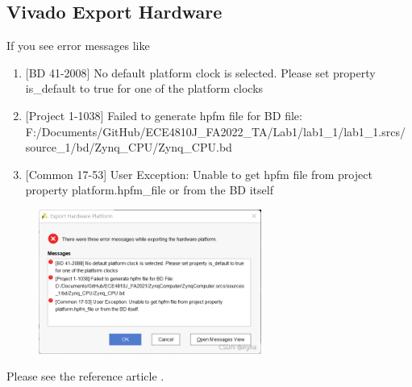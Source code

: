 \documentclass[a4paper,12pt,twoside]{article}
\begin{document}
\subsection{Vivado Export Hardware}\label{AA1}
If you see error messages like
\begin{enumerate}
    \item {[BD 41-2008]} No default platform clock is selected. Please set property is\_default to true for one of the platform clocks
    \item {[Project 1-1038]} Failed to generate hpfm file for BD file:\\
    F:/Documents/GitHub/ECE4810J\_FA2022\_TA/Lab1/lab1\_1/lab1\_1.srcs/\\
    source\_1/bd/Zynq\_CPU/Zynq\_CPU.bd
    \item {[Common 17-53]} User Exception: Unable to get hpfm file from project property platform.hpfm\_file or from the BD itself
\end{enumerate}
\begin{figure}[H]
    \centering
    \includegraphics[width=0.65\textwidth]{images/17.png}
\end{figure}
Please see the reference article \cite{vivadoexport}.
\end{document}
